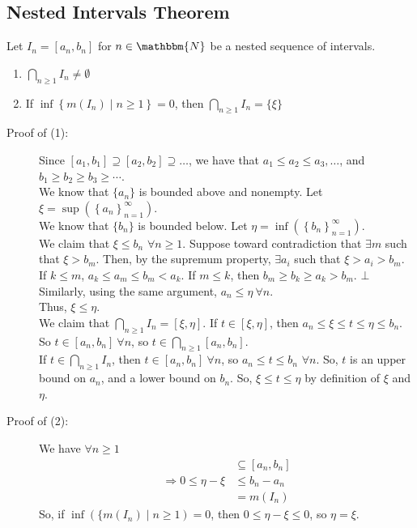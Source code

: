 \documentclass[10pt]{extarticle}
\newcommand{\N}{\mathbbm{N}}
\begin{document}
    \subsection{Nested Intervals Theorem}%
    Let $I_n = [a_n,b_n]$ for $n\in\N$ be a nested sequence of intervals.
    \begin{enumerate}[(1)]
      \item $\bigcap_{n \geq 1}I_n \neq \emptyset$
      \item If $\inf\left\{m(I_n)\mid n\geq 1\right\} = 0$, then $\bigcap_{n\geq 1} I_n = \{\xi\}$
    \end{enumerate}
    \begin{description}
      \item[Proof of (1):] Since $[a_1,b_1] \supseteq [a_2,b_2] \supseteq \dots$, we have that $a_1\leq a_2\leq a_3,\dots$, and $b_1 \geq b_2 \geq b_3 \geq \cdots$.\\

      We know that $\{a_n\}$ is bounded above and nonempty. Let $\xi = \sup\left(\left\{a_n\right\}_{n=1}^{\infty}\right)$.\\

      We know that $\{b_n\}$ is bounded below. Let $\eta = \inf\left(\left\{b_n\right\}_{n=1}^{\infty}\right)$.\\

      We claim that $\xi \leq b_n$ $\forall n \geq 1$. Suppose toward contradiction that $\exists m$ such that $\xi > b_m$. Then, by the supremum property, $\exists a_i$ such that $\xi > a_i > b_m$. If $k\leq m$, $a_k \leq a_m \leq b_m < a_k$. If $m \leq k$, then $b_m \geq b_k \geq a_k > b_m$. $\bot$\\

      Similarly, using the same argument, $a_n \leq \eta~\forall n$.\\

      Thus, $\xi \leq \eta$.\\

      We claim that $\bigcap_{n\geq 1} I_n = [\xi,\eta]$. If $t\in [\xi,\eta]$, then $a_n \leq \xi \leq t \leq \eta \leq b_n$. So $t\in [a_n,b_n]~\forall n$, so $t\in \bigcap_{n\geq 1} [a_n,b_n]$.\\

      If $t\in \bigcap_{n\geq 1}I_n$, then $t\in [a_n,b_n]~\forall n$, so $a_n \leq t \leq b_n$ $\forall n$. So, $t$ is an upper bound on $a_n$, and a lower bound on $b_n$. So, $\xi \leq t \leq \eta$ by definition of $\xi$ and $\eta$.
    \item[Proof of (2):] We have $\forall n\geq 1$
      \begin{align*}
        [\xi,\eta] &\subseteq [a_n,b_n]\\
        \Rightarrow 0 \leq \eta-\xi &\leq b_n-a_n\\
                                    &= m(I_n)
      \end{align*}
      So, if $\inf\left(\{m(I_n)\mid n\geq 1\right) = 0$, then $0\leq \eta-\xi \leq 0$, so $\eta = \xi$.
    \end{description}
\end{document}
